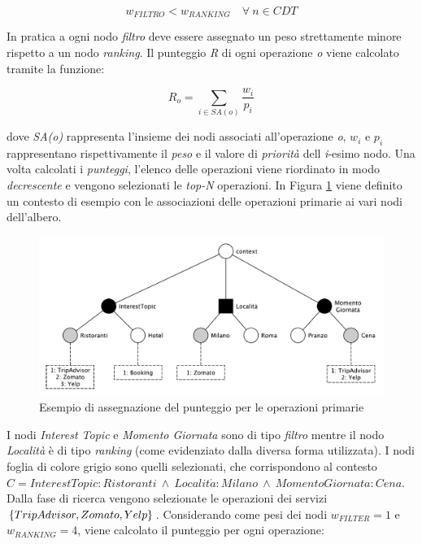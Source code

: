 \begin{equation*}
w_{FILTRO} < w_{RANKING} \quad \forall\ n \in CDT
\end{equation*}

In pratica a ogni nodo \emph{filtro} deve essere assegnato un peso strettamente minore rispetto a un nodo \emph{ranking}. Il punteggio \emph{R} di ogni operazione \emph{o} viene calcolato tramite la funzione:

\begin{equation}\label{eq:primary-service-formula}
R_o = \sum_{i \in SA(o)}{\frac{w_i}{p_i}}
\end{equation}

dove \emph{SA(o)} rappresenta l'insieme dei nodi associati all'operazione \emph{o}, $ w_i $ e $ p_i $ rappresentano rispettivamente il \emph{peso} e il valore di \emph{priorità} dell \emph{i}-esimo nodo. Una volta calcolati i \emph{punteggi}, l'elenco delle operazioni viene riordinato in modo \emph{decrescente} e vengono selezionati le \emph{top-N} operazioni. In Figura \ref{fig:esempio-punteggio-primari} viene definito un contesto di esempio con le associazioni delle operazioni primarie ai vari nodi dell'albero.

\begin{figure}[ht]
	\centering
	\includegraphics[width=\textwidth]{3-metodologia-camus/Immagini/esempio-punteggio-primari.pdf}
	\caption{Esempio di assegnazione del punteggio per le operazioni primarie}\label{fig:esempio-punteggio-primari}
\end{figure}

I nodi \emph{Interest Topic} e \emph{Momento Giornata} sono di tipo \emph{filtro} mentre il nodo \emph{Località} è di tipo \emph{ranking} (come evidenziato dalla diversa forma utilizzata). I nodi foglia di colore grigio sono quelli selezionati, che corrispondono al contesto $ C = InterestTopic: Ristoranti\ \land\ Localit\acute{a}: Milano\ \land\ MomentoGiornata: Cena $. Dalla fase di ricerca vengono selezionate le operazioni dei servizi $ \{TripAdvisor, Zomato,\\ Yelp\} $. Considerando come pesi dei nodi $ w_{FILTER} = 1 $  e $ w_{RANKING} = 4 $, viene calcolato il punteggio per ogni operazione:

